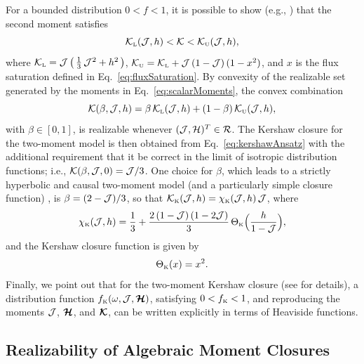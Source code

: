 For a bounded distribution $0<f<1$, it is possible to show (e.g., \cite{banachLarecki_2013}) that the second moment satisfies
\begin{equation}
  \mathcal{K}_{\mbox{\tiny L}}(\mathcal{J},h) < \mathcal{K} < \mathcal{K}_{\mbox{\tiny U}}(\mathcal{J},h),
\end{equation}
where $\mathcal{K}_{\mbox{\tiny L}}=\mathcal{J}\,\big(\,\frac{1}{3}\,\mathcal{J}^{2}+h^{2}\,\big)$, $\mathcal{K}_{\mbox{\tiny U}}=\mathcal{K}_{\mbox{\tiny L}} + \mathcal{J}\,(1-\mathcal{J})\,(1-x^{2})$, and $x$ is the flux saturation defined in Eq.~\eqref{eq:fluxSaturation}.  
By convexity of the realizable set generated by the moments in Eq.~\eqref{eq:scalarMoments}, the convex combination
\begin{equation}
  \mathcal{K}(\beta,\mathcal{J},h)=\beta\,\mathcal{K}_{\mbox{\tiny L}}(\mathcal{J},h)+(1-\beta)\,\mathcal{K}_{\mbox{\tiny U}}(\mathcal{J},h),
  \label{eq:kershawAnsatz}
\end{equation}
with $\beta\in[0,1]$, is realizable whenever $(\mathcal{J},\mathcal{H})^{T}\in\mathcal{R}$.  
The Kershaw closure for the two-moment model is then obtained from Eq.~\eqref{eq:kershawAnsatz} with the additional requirement that it be correct in the limit of isotropic distribution functions; i.e., $\mathcal{K}(\beta,\mathcal{J},0)=\mathcal{J}/3$.  
One choice for $\beta$, which leads to a strictly hyperbolic and causal two-moment model (and a particularly simple closure function) \cite{banachLarecki_2017a}, is $\beta=(2-\mathcal{J})/3$, so that $\mathcal{K}_{\mbox{\tiny K}}(\mathcal{J},h)=\chi_{\mbox{\tiny K}}(\mathcal{J},h)\,\mathcal{J}$, where
\begin{equation}
  \chi_{\mbox{\tiny K}}(\mathcal{J},h)=\frac{1}{3}+\frac{2\,(1-\mathcal{J})\,(1-2\mathcal{J})}{3}\,\Theta_{\mbox{\tiny K}}\Big(\frac{h}{1-\mathcal{J}}\Big),
  \label{eq:eddingtonFactorKershaw}
\end{equation}
and the Kershaw closure function is given by
\begin{equation}
  \Theta_{\mbox{\tiny K}}(x)=x^{2}.  
\end{equation}
Finally, we point out that for the two-moment Kershaw closure (see \cite{banachLarecki_2017a} for details), a distribution function $f_{\mbox{\tiny K}}(\omega,\mathcal{J},\boldsymbol{\mathcal{H}})$, satisfying $0 < f_{\mbox{\tiny K}} < 1$, and reproducing the moments $\mathcal{J}$, $\boldsymbol{\mathcal{H}}$, and $\boldsymbol{\mathcal{K}}$, can be written explicitly in terms of Heaviside functions.  

\subsection{Realizability of Algebraic Moment Closures}

